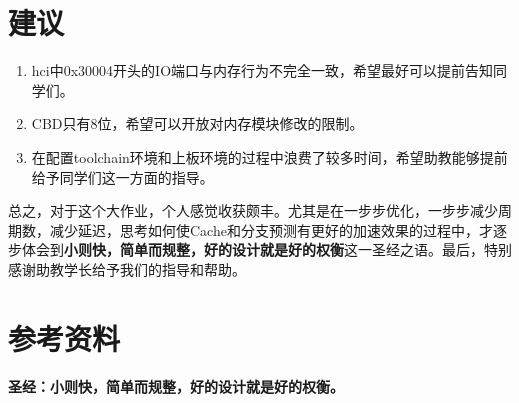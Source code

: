 \documentclass[a4paper,UTF8]{article}
\begin{document}
\section{建议}

\begin{enumerate}
\item hci中0x30004开头的IO端口与内存行为不完全一致，希望最好可以提前告知同学们。
\item CBD只有8位，希望可以开放对内存模块修改的限制。
\item 在配置toolchain环境和上板环境的过程中浪费了较多时间，希望助教能够提前给予同学们这一方面的指导。
\end{enumerate}

总之，对于这个大作业，个人感觉收获颇丰。尤其是在一步步优化，一步步减少周期数，减少延迟，思考如何使Cache和分支预测有更好的加速效果的过程中，才逐步体会到\textbf{小则快，简单而规整，好的设计就是好的权衡}这一圣经之语。最后，特别感谢助教学长给予我们的指导和帮助。

\section{参考资料}
\textbf{圣经：小则快，简单而规整，好的设计就是好的权衡。}
\end{document}
